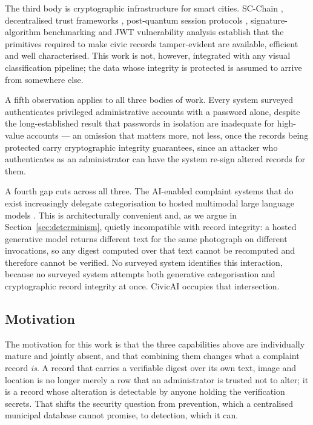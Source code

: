 \documentclass[conference]{IEEEtran}
\begin{document}
The third body is cryptographic infrastructure for smart cities. SC-Chain \cite{l16scchain}, decentralised trust frameworks \cite{l17decentralizedtrust}, post-quantum session protocols \cite{l18pqcsession}, signature-algorithm benchmarking \cite{l19ecdsabenchmark} and JWT vulnerability analysis \cite{l20jwteemo} establish that the primitives required to make civic records tamper-evident are available, efficient and well characterised. This work is not, however, integrated with any visual classification pipeline; the data whose integrity is protected is assumed to arrive from somewhere else.

A fifth observation applies to all three bodies of work. Every system surveyed authenticates privileged administrative accounts with a password alone, despite the long-established result that passwords in isolation are inadequate for high-value accounts \cite{bonneau2012passwords} --- an omission that matters more, not less, once the records being protected carry cryptographic integrity guarantees, since an attacker who authenticates as an administrator can have the system re-sign altered records for them.

A fourth gap cuts across all three. The AI-enabled complaint systems that do exist increasingly delegate categorisation to hosted multimodal large language models \cite{l9mllmaudit, l10quantizedvlm, l12urbanllava, touvron2023llama}. This is architecturally convenient and, as we argue in Section~\ref{sec:determinism}, quietly incompatible with record integrity: a hosted generative model returns different text for the same photograph on different invocations, so any digest computed over that text cannot be recomputed and therefore cannot be verified. No surveyed system identifies this interaction, because no surveyed system attempts both generative categorisation and cryptographic record integrity at once. CivicAI occupies that intersection.

\subsection{Motivation}
The motivation for this work is that the three capabilities above are individually mature and jointly absent, and that combining them changes what a complaint record \emph{is}. A record that carries a verifiable digest over its own text, image and location is no longer merely a row that an administrator is trusted not to alter; it is a record whose alteration is detectable by anyone holding the verification secrets. That shifts the security question from prevention, which a centralised municipal database cannot promise, to detection, which it can.
\end{document}
